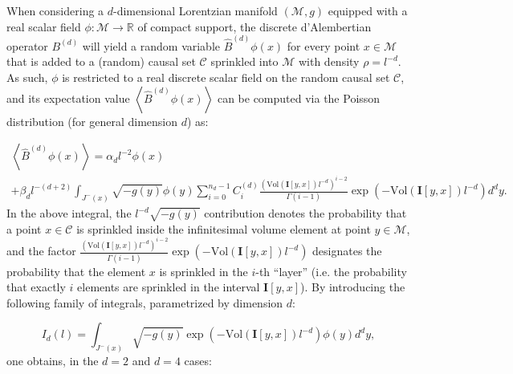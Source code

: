 \documentclass{article}
\begin{document}
When considering a $d$-dimensional Lorentzian manifold ${\left( \mathcal{M}, g \right)}$ equipped with a real scalar field ${\phi : \mathcal{M} \to \mathbb{R}}$ of compact support, the discrete d'Alembertian operator ${B^{\left( d \right)}}$ will yield a random variable ${\hat{B}^{\left( d \right)} \phi \left( x \right)}$ for every point ${x \in \mathcal{M}}$ that is added to a (random) causal set ${\mathcal{C}}$ sprinkled into ${\mathcal{M}}$ with density ${\rho = l^{-d}}$. As such, ${\phi}$ is restricted to a real discrete scalar field on the random causal set ${\mathcal{C}}$, and its expectation value ${\left\langle \hat{B}^{\left( d \right)} \phi \left( x \right) \right\rangle}$ can be computed via the Poisson distribution (for general dimension $d$) as:

\begin{multline}
\left\langle \hat{B}^{\left( d \right)} \phi \left( x \right) \right\rangle = \alpha_d l^{-2} \phi \left( x \right)\\
+ \beta_d l^{- \left( d + 2 \right)} \int_{J^{-} \left( x \right)} \sqrt{-g \left( y \right)} \phi \left( y \right) \sum_{i = 0}^{n_d - 1} C_{i}^{\left( d \right)} \frac{\left( \mathrm{Vol} \left( \mathbf{I} \left[ y, x \right] \right) l^{-d} \right)^{i - 2}}{\Gamma \left( i - 1 \right)} \exp \left( - \mathrm{Vol} \left( \mathbf{I} \left[ y, x \right] \right) l^{-d} \right) d^d y.
\end{multline}
In the above integral, the ${l^{-d} \sqrt{- g \left( y \right)}}$ contribution denotes the probability that a point ${x \in \mathcal{C}}$ is sprinkled inside the infinitesimal volume element at point ${y \in \mathcal{M}}$, and the factor ${\frac{\left( \mathrm{Vol} \left( \mathbf{I} \left[ y, x \right] \right) l^{-d} \right)^{i - 2}}{\Gamma \left( i - 1 \right)} \exp \left( - \mathrm{Vol} \left( \mathbf{I} \left[ y, x \right] \right) l^{-d} \right)}$ designates the probability that the element $x$ is sprinkled in the $i$-th ``layer'' (i.e. the probability that exactly $i$ elements are sprinkled in the interval ${\mathbf{I} \left[ y, x \right]}$). By introducing the following family of integrals, parametrized by dimension $d$:

\begin{equation}
I_{d} \left( l \right) = \int_{J^{-} \left( x \right)} \sqrt{-g \left( y \right)} \exp \left( - \mathrm{Vol} \left( \mathbf{I} \left[ y, x \right] \right) l^{-d} \right) \phi \left( y \right) d^d y,
\end{equation}
one obtains, in the ${d = 2}$ and ${d = 4}$ cases:
\end{document}
